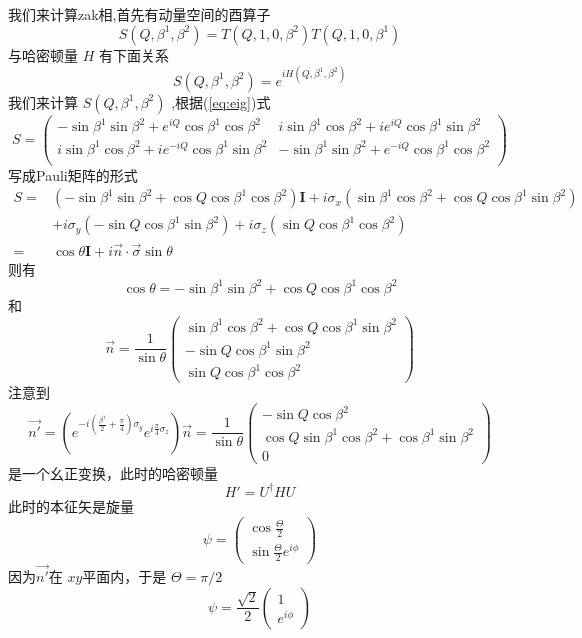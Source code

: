 \documentclass[hyperref,UTF8]{ctexart}
\begin{document}
我们来计算zak相,首先有动量空间的酉算子
\[S(Q,\beta^1,\beta^2)=T(Q,1,0,\beta^2)T(Q,1,0,\beta^1)\]
与哈密顿量 $H$ 有下面关系
\[S(Q,\beta^1,\beta^2)=e^{i H(Q,\beta^1,\beta^2)}\]
我们来计算 $S(Q,\beta^1,\beta^2)$ ,根据(\ref{eq:eig})式
\[S=
    \begin{pmatrix}
     -\sin \beta ^1 \sin \beta ^2+e^{i Q} \cos \beta ^1 \cos \beta ^2 & 
     i \sin \beta ^1 \cos\beta ^2+i e^{i Q} \cos \beta ^1 \sin \beta ^2 \\
     i \sin \beta ^1 \cos \beta ^2+i e^{-i Q} \cos \beta ^1 \sin \beta ^2 & 
     -\sin \beta ^1\sin \beta ^2+e^{-i Q} \cos \beta ^1 \cos \beta ^2 \\
    \end{pmatrix}
\]
写成Pauli矩阵的形式
\begin{align*}
    S=&(-\sin \beta ^1 \sin \beta ^2+\cos Q \cos \beta ^1 \cos \beta ^2)\mathbf{I}+i\sigma_x(\sin \beta ^1 \cos\beta ^2+\cos Q \cos \beta ^1 \sin \beta ^2)\\
    &+i\sigma_y(-\sin Q \cos \beta ^1 \sin \beta ^2)+i\sigma_z(\sin Q \cos \beta ^1 \cos \beta ^2)\\
    =&\cos \theta\mathbf{I}+i\vec{n} \cdot \vec{\sigma}\sin \theta
\end{align*}
则有
\[\cos \theta =-\sin \beta ^1 \sin \beta ^2+\cos Q \cos \beta ^1 \cos \beta ^2\]
和
\[\vec{n}=\frac{1}{\sin \theta } \begin{pmatrix}
    \sin \beta ^1 \cos\beta ^2+\cos Q \cos \beta ^1 \sin \beta ^2\\
    -\sin Q \cos \beta ^1 \sin \beta ^2\\
    \sin Q \cos \beta ^1 \cos \beta ^2
\end{pmatrix}\]
注意到
\[\vec{n'}=(e^{-i(\frac{\beta^1}{2}+\frac{\pi}{4})\sigma_y}e^{i\frac{\pi}{4}\sigma_z})\vec{n}=\frac{1}{\sin \theta } \begin{pmatrix}
    -\sin Q \cos \beta ^2 \\
    \cos Q \sin \beta ^1 \cos\beta ^2+\cos \beta ^1 \sin \beta ^2\\
    0
\end{pmatrix}\]
是一个幺正变换，此时的哈密顿量
\[H'=U^\dagger H U\]
此时的本征矢是旋量
\[\psi=\begin{pmatrix}
    \cos \frac{\Theta}{2}\\
    \sin\frac{\Theta}{2} e^{i\phi}
\end{pmatrix}\]
因为$\vec{n'}$在 $xy$平面内，于是 $\Theta=\pi/2$
\[\psi=\frac{\sqrt{2}}{2}\begin{pmatrix}
    1\\
     e^{i\phi}
\end{pmatrix}\]  
\end{document}
